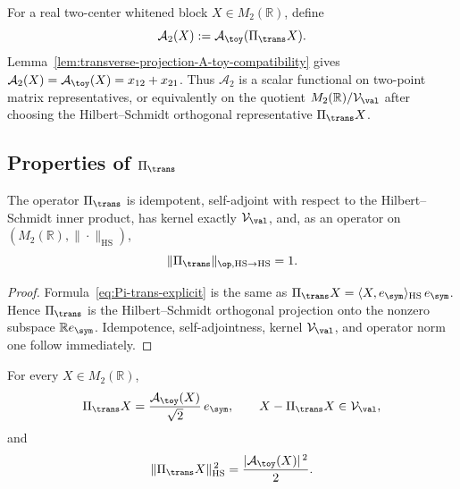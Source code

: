 \begin{definition}
\label{def:two-point-scalar-transverse-channel}
For a real two-center whitened block \(X\in M_2(\mathbb R)\), define
\begin{equation}
\label{eq:two-point-scalar-channel}
        \mathcal A_2(X):=\mathcal A_\toy(\Pi_\trans X).
\end{equation}
Lemma~\ref{lem:transverse-projection-A-toy-compatibility} gives
\(\mathcal A_2(X)=\mathcal A_\toy(X)=x_{12}+x_{21}\).  Thus
\(\mathcal A_2\) is a scalar functional on two-point matrix
representatives, or equivalently on the quotient
\(M_2(\mathbb R)/\mathcal V_\val\) after choosing the
Hilbert--Schmidt orthogonal representative \(\Pi_\trans X\).
\end{definition}

\subsection{Properties of \(\Pi_\trans\)}
\label{subsec:transverse-projection-properties}

\begin{lemma}
\label{lem:transverse-projection-properties}
The operator \(\Pi_\trans\) is idempotent, self-adjoint with respect
to the Hilbert--Schmidt inner product, has kernel exactly
\(\mathcal V_\val\), and, as an operator on
\((M_2(\mathbb R),\|\cdot\|_{\mathrm{HS}})\),
\begin{equation}
\label{eq:Pi-trans-norm}
        \|\Pi_\trans\|_{\op,\mathrm{HS}\to\mathrm{HS}}=1.
\end{equation}
\end{lemma}

\begin{proof}
Formula~\eqref{eq:Pi-trans-explicit} is the same as
\(\Pi_\trans X=\langle X,e_\sym\rangle_{\mathrm{HS}}\,e_\sym\).  Hence
\(\Pi_\trans\) is the Hilbert--Schmidt orthogonal projection onto the
nonzero subspace \(\mathbb R e_\sym\).  Idempotence,
self-adjointness, kernel \(\mathcal V_\val\), and operator norm one
follow immediately.
\end{proof}

\begin{lemma}
\label{lem:transverse-projection-quotient-representative}
For every \(X\in M_2(\mathbb R)\),
\begin{equation}
\label{eq:Pi-trans-representative}
        \Pi_\trans X=\frac{\mathcal A_\toy(X)}{\sqrt2}\,e_\sym,
        \qquad X-\Pi_\trans X\in\mathcal V_\val,
\end{equation}
and
\begin{equation}
\label{eq:Pi-trans-HS-norm-scalar}
        \|\Pi_\trans X\|_{\mathrm{HS}}^{\,2}
        =\frac{|\mathcal A_\toy(X)|^{\,2}}{2}.
\end{equation}
\end{lemma}

